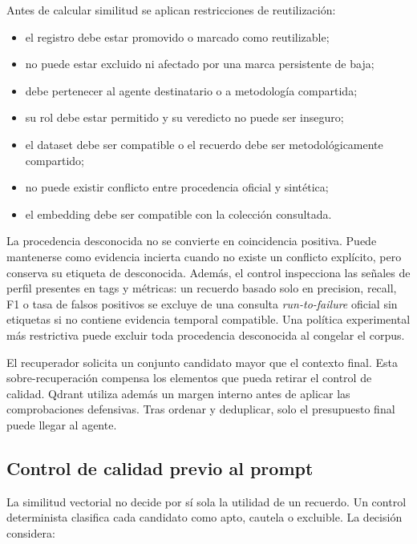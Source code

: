 Antes de calcular similitud se aplican restricciones de reutilización:

\begin{itemize}
  \item el registro debe estar promovido o marcado como reutilizable;
  \item no puede estar excluido ni afectado por una marca persistente de baja;
  \item debe pertenecer al agente destinatario o a metodología compartida;
  \item su rol debe estar permitido y su veredicto no puede ser inseguro;
  \item el dataset debe ser compatible o el recuerdo debe ser
        metodológicamente compartido;
  \item no puede existir conflicto entre procedencia oficial y sintética;
  \item el embedding debe ser compatible con la colección consultada.
\end{itemize}

La procedencia desconocida no se convierte en coincidencia positiva. Puede
mantenerse como evidencia incierta cuando no existe un conflicto explícito,
pero conserva su etiqueta de desconocida. Además, el control inspecciona las
señales de perfil presentes en tags y métricas: un recuerdo basado solo en
precision, recall, F1 o tasa de falsos positivos se excluye de una consulta
\textit{run-to-failure} oficial sin etiquetas si no contiene evidencia temporal
compatible. Una política experimental más restrictiva puede excluir toda
procedencia desconocida al congelar el corpus.

El recuperador solicita un conjunto candidato mayor que el contexto final. Esta
sobre-recuperación compensa los elementos que pueda retirar el control de
calidad. Qdrant utiliza además un margen interno antes de aplicar las
comprobaciones defensivas. Tras ordenar y deduplicar, solo el presupuesto final
puede llegar al agente.

\subsection{Control de calidad previo al prompt}

La similitud vectorial no decide por sí sola la utilidad de un recuerdo. Un
control determinista clasifica cada candidato como apto, cautela o excluible.
La decisión considera:

